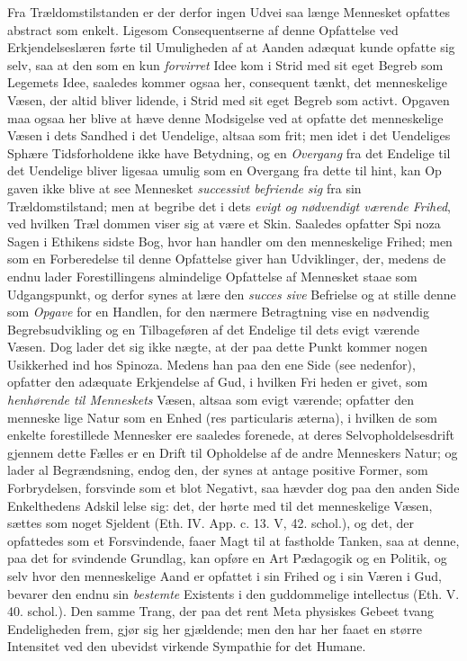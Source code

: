 \documentclass[12pt,a4paper]{book}
\newcommand{\opage}[1]{\marginnote{\footnotesize\textit{[#1]}}}
\begin{document}
Fra Trældomstilstanden er der derfor ingen Udvei saa\-%
længe Mennesket opfattes abstract som enkelt. Ligesom
Consequentserne af denne Opfattelse ved Erkjendelseslæren
førte til Umuligheden af at Aanden adæquat kunde opfatte
sig selv, saa at den som en kun \emph{forvirret} Idee kom i
Strid med sit eget Begreb som Legemets Idee, saaledes
kommer ogsaa her, consequent tænkt, det menneskelige
Væsen, der altid bliver lidende, i Strid med sit eget Begreb
som activt. Opgaven maa ogsaa her blive at hæve denne
Modsigelse ved at opfatte det menneskelige Væsen i dets
Sandhed i det Uendelige, altsaa som frit; men idet i det
Uendeliges Sphære Tidsforholdene ikke have Betydning, og
en \emph{Overgang} fra det Endelige til det Uendelige bliver
ligesaa umulig som en Overgang fra dette til hint, kan Op\-%
gaven ikke blive at see Mennesket \emph{successivt befriende
sig} fra sin Trældomstilstand; men at begribe det i dets
\emph{evigt og nødvendigt værende Frihed}, ved hvilken Træl\-%
dommen viser sig at være et Skin. Saaledes opfatter Spi\-%
noza Sagen i Ethikens sidste Bog, hvor han handler om
den menneskelige Frihed; men som en Forberedelse til denne
Opfattelse giver han Udviklinger, der, medens de endnu lader
Forestillingens almindelige Opfattelse af Mennesket staae
som Udgangspunkt, og derfor synes at lære den \emph{succes\-%
sive} Befrielse og at stille denne som \emph{Opgave} for en
Handlen, for den nærmere Betragtning vise en nødvendig
Begrebsudvikling og en Tilbageføren af det Endelige til dets
evigt værende Væsen. Dog lader det sig ikke nægte, at
der paa dette Punkt kommer nogen Usikkerhed ind hos
Spinoza. Medens han paa den ene Side (see nedenfor),
opfatter den adæquate Erkjendelse af Gud, i hvilken Fri\-%
heden er givet, som \emph{henhørende til Menneskets}
\opage{122} \setcounter{footnote}{0}%
Væsen, altsaa som evigt værende; opfatter den menneske\-%
lige Natur som en Enhed (res particularis æterna), i hvilken
de som enkelte forestillede Mennesker ere saaledes forenede,
at deres Selvopholdelsesdrift gjennem dette Fælles er en
Drift til Opholdelse af de andre Menneskers Natur; og lader
al Begrændsning, endog den, der synes at antage positive
Former, som Forbrydelsen, forsvinde som et blot Negativt,
saa hævder dog paa den anden Side Enkelthedens Adskil\-%
lelse sig: det, der hørte med til det menneskelige Væsen,
sættes som noget Sjeldent (Eth. IV. App. c. 13. V, 42.
schol.), og det, der opfattedes som et Forsvindende, faaer
Magt til at fastholde Tanken, saa at denne, paa det for\-%
svindende Grundlag, kan opføre en Art Pædagogik og en
Politik, og selv hvor den menneskelige Aand er opfattet i
sin Frihed og i sin Væren i Gud, bevarer den endnu sin
\emph{bestemte} Existents i den guddommelige intellectus (Eth.
V. 40. schol.). Den samme Trang, der paa det rent Meta\-%
physiskes Gebeet tvang Endeligheden frem, gjør sig her
gjældende; men den har her faaet en større Intensitet ved
den ubevidst virkende Sympathie for det Humane.
\end{document}
